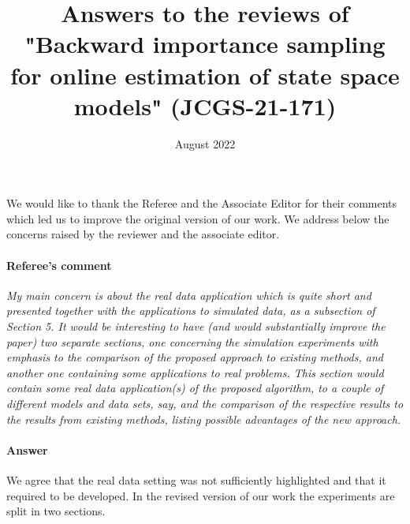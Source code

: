 \documentclass{article}
\title{Answers to the reviews of "Backward importance sampling for online estimation of state space models" (JCGS-21-171)}
\date{August 2022}
\begin{document}
\maketitle

We would like to thank the Referee and the Associate Editor for their comments which led us to improve the original version of our work. 
We address below the concerns raised by the reviewer and the associate editor.

\paragraph{Referee's comment}
\textit{My main concern is about the real data application which is quite short and presented together with the applications to simulated data, as a subsection of Section 5. It would be interesting to have (and would substantially improve the paper) two separate sections, one concerning the simulation experiments with emphasis to the comparison of the proposed approach to existing methods, and another one containing some applications to real problems. This section would contain some real data application(s) of the proposed algorithm, to a couple of different models and data sets, say, and the comparison of the respective results to the results from existing methods, listing possible advantages of the new approach.}

\paragraph{Answer} We agree that the real data setting was not sufficiently highlighted and that it required to be developed. In the revised version of our work the experiments are split in two sections. 
\end{document}
